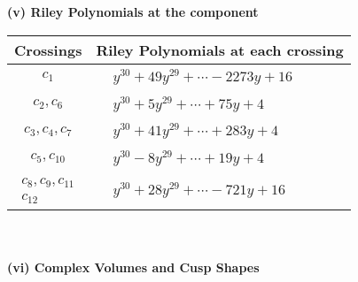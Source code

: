 \documentclass[1p]{elsarticle_modified}
\theoremstyle{definition}
\begin{document}
\newpage\renewcommand{\arraystretch}{1}
\flushleft \textbf{(v) Riley Polynomials at the component}\newline \\
\begin{tabular}{m{50pt}|m{274pt}}
Crossings & \hspace{64pt}Riley Polynomials at each crossing \\
\hline $$\begin{aligned}c_{1}\end{aligned}$$&$\begin{aligned}
&y^{30}+49 y^{29}+\cdots-2273 y+16
\end{aligned}$\\
\hline $$\begin{aligned}c_{2},c_{6}\end{aligned}$$&$\begin{aligned}
&y^{30}+5 y^{29}+\cdots+75 y+4
\end{aligned}$\\
\hline $$\begin{aligned}c_{3},c_{4},c_{7}\end{aligned}$$&$\begin{aligned}
&y^{30}+41 y^{29}+\cdots+283 y+4
\end{aligned}$\\
\hline $$\begin{aligned}c_{5},c_{10}\end{aligned}$$&$\begin{aligned}
&y^{30}-8 y^{29}+\cdots+19 y+4
\end{aligned}$\\
\hline $$\begin{aligned}c_{8},c_{9},c_{11}\\c_{12}\end{aligned}$$&$\begin{aligned}
&y^{30}+28 y^{29}+\cdots-721 y+16
\end{aligned}$\\
\hline
\end{tabular}\\~\\
\newpage\flushleft \textbf{(vi) Complex Volumes and Cusp Shapes}
\end{document}

